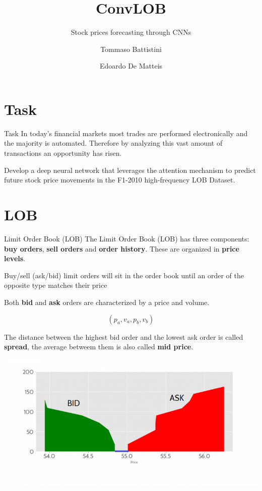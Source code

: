 \documentclass{beamer}
\title{ConvLOB}
\subtitle{Stock prices forecasting through CNNs}
\author{Tommaso Battistini \and Edoardo De Matteis}
\date{}
\institute[La Sapienza University of Rome]
\begin{document}
\frame{\titlepage}

\section{Task}

\begin{frame}{Task}
    In today's financial markets most trades are performed electronically and the majority is automated.
    Therefore by analyzing this vast amount of transactions an opportunity has risen.
\end{frame}

\begin{frame}
    Develop a deep neural network that leverages the attention mechanism to predict future stock price movements in the F1-2010 high-frequency LOB Dataset.
\end{frame}

\section{LOB}
\begin{frame}{Limit Order Book (LOB)}
    The Limit Order Book (LOB) has three components: \textbf{buy orders}, \textbf{sell orders} and \textbf{order history}.
    These are organized in \textbf{price levels}.

    Buy/sell (ask/bid) limit orders will sit in the order book until an order of the opposite type matches their price
\end{frame}

\begin{frame}
    Both \textbf{bid} and \textbf{ask} orders are characterized by a price and volume.

    \begin{equation}
        (p_a, v_a, p_b, v_b)
    \end{equation}

    The distance between the highest bid order and the lowest ask order is called \textbf{spread}, the average betweem them is also called \textbf{mid price}.
\end{frame}

\begin{frame}
    \centering
    \includegraphics[scale=0.38]{imgs/asf.png}
\end{frame}
\end{document}

